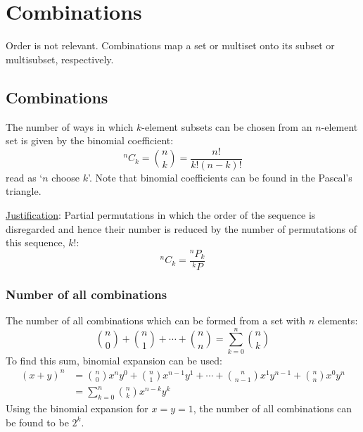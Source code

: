 \documentclass{article}
\begin{document}

\section{Combinations}

Order is not relevant. Combinations map a set or multiset onto its subset or multisubset, respectively.

\subsection{Combinations}
\label{combinations}

The number of ways in which $k$\nobreakdash-\hspace{0pt}element subsets can be chosen from an $n$\nobreakdash-\hspace{0pt}element set is given by the binomial coefficient:
%
\begin{equation}
    ^nC_k = \binom{n}{k} = \frac{n!}{k!(n-k)!}
\end{equation}
%
read as `$n$ choose $k$'. Note that binomial coefficients can be found in the Pascal's triangle.

\underline{Justification}:
Partial permutations in which the order of the sequence is disregarded and hence their number is reduced by the number of permutations of this sequence, $k!$:
%
\begin{equation}
        ^nC_k = \frac{^nP_k}{^kP}
\end{equation}

\subsubsection{Number of all combinations}

The number of all combinations which can be formed from a set with $n$ elements:
%
\begin{equation}
    \label{eq:all_comb}
    \binom{n}{0} + \binom{n}{1} + \dotsb + \binom{n}{n}= \sum_{k=0}^{n} \binom{n}{k}
\end{equation}
%
To find this sum, binomial expansion can be used:
%
\begin{equation}
    \begin{split}
        (x+y)^n & = \binom{n}{0} x^n y^0 + \binom{n}{1} x^{n-1} y^1 + \dotsb + \binom{n}{n-1} x^1 y^{n-1} + \binom{n}{n} x^0 y^n \\
                & = \sum_{k=0}^{n} \binom{n}{k} x^{n-k} y^k
    \end{split}
\end{equation}
%
Using the binomial expansion for $x=y=1$, the number of all combinations can be found to be $2^k$.
\end{document}
